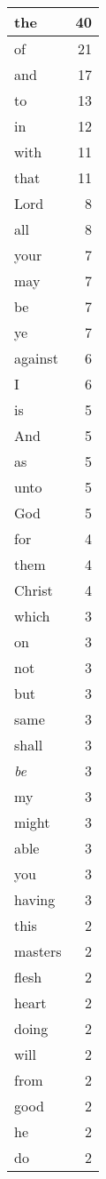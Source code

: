\begin{center}
\begin{longtable}{l|r}
the & 40\\ \hline 
of & 21\\ \hline 
and & 17\\ \hline 
to & 13\\ \hline 
in & 12\\ \hline 
with & 11\\ \hline 
that & 11\\ \hline 
Lord & 8\\ \hline 
all & 8\\ \hline 
your & 7\\ \hline 
may & 7\\ \hline 
be & 7\\ \hline 
ye & 7\\ \hline 
against & 6\\ \hline 
I & 6\\ \hline 
is & 5\\ \hline 
And & 5\\ \hline 
as & 5\\ \hline 
unto & 5\\ \hline 
God & 5\\ \hline 
for & 4\\ \hline 
them & 4\\ \hline 
Christ & 4\\ \hline 
which & 3\\ \hline 
on & 3\\ \hline 
not & 3\\ \hline 
but & 3\\ \hline 
same & 3\\ \hline 
shall & 3\\ \hline 
\emph{be} & 3\\ \hline 
my & 3\\ \hline 
might & 3\\ \hline 
able & 3\\ \hline 
you & 3\\ \hline 
having & 3\\ \hline 
this & 2\\ \hline 
masters & 2\\ \hline 
flesh & 2\\ \hline 
heart & 2\\ \hline 
doing & 2\\ \hline 
will & 2\\ \hline 
from & 2\\ \hline 
good & 2\\ \hline 
he & 2\\ \hline 
do & 2\\ \hline 

\end{longtable}
\end{center}
